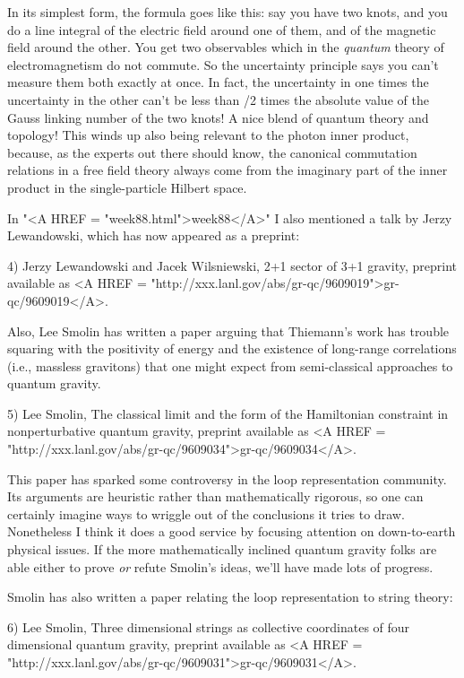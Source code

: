 In its simplest form, the formula goes like this: say you have two
knots, and you do a line integral of the electric field around one of
them, and of the magnetic field around the other.  You get two
observables which in the \emph{quantum} theory of electromagnetism do not
commute.  So the uncertainty principle says you can't measure them both
exactly at once.  In fact, the uncertainty in one times the uncertainty
in the other can't be less than \hbar /2 times the absolute value of the
Gauss linking number of the two knots!  A nice blend of quantum theory
and topology!  This winds up also being relevant to the photon
inner product, because, as the experts out there should know, the
canonical commutation relations in a free field theory always come from
the imaginary part of the inner product in the single-particle Hilbert
space.  

In "<A HREF = "week88.html">week88</A>" I also mentioned a talk by Jerzy Lewandowski, which has
now appeared as a preprint:

4) Jerzy Lewandowski and Jacek Wilsniewski, 2+1 sector of 3+1 gravity,
preprint available as <A HREF = "http://xxx.lanl.gov/abs/gr-qc/9609019">gr-qc/9609019</A>.

Also, Lee Smolin has written a paper arguing that Thiemann's work has
trouble squaring with the positivity of energy and the existence of
long-range correlations (i.e., massless gravitons) that one might expect
from semi-classical approaches to quantum gravity.  

5) Lee Smolin, The classical limit and the form of the Hamiltonian
constraint in nonperturbative quantum gravity, preprint available
as <A HREF = "http://xxx.lanl.gov/abs/gr-qc/9609034">gr-qc/9609034</A>.

This paper has sparked some controversy in the loop representation
community.  Its arguments are heuristic rather than mathematically
rigorous, so one can certainly imagine ways to wriggle out of the
conclusions it tries to draw.  Nonetheless I think it does a good
service by focusing attention on down-to-earth physical issues.
If the more mathematically inclined quantum gravity folks are able
either to prove \emph{or} refute Smolin's ideas, we'll have made lots of
progress.  

Smolin has also written a paper relating the loop representation to
string theory:

6) Lee Smolin, Three dimensional strings as collective coordinates of
four dimensional quantum gravity, preprint available as <A HREF = "http://xxx.lanl.gov/abs/gr-qc/9609031">gr-qc/9609031</A>.

